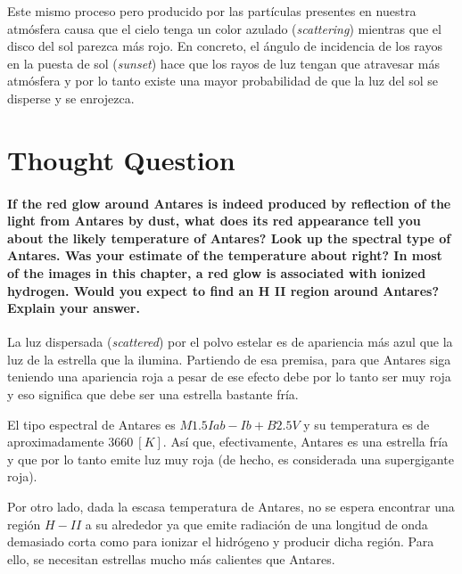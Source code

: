 \documentclass{tufte-handout}
\begin{document}
Este mismo proceso pero producido por las partículas presentes en nuestra atmósfera causa que el cielo tenga un color azulado (\emph{scattering}) mientras que el disco del sol parezca más rojo. En concreto, el ángulo de incidencia de los rayos en la puesta de sol (\emph{sunset}) hace que los rayos de luz tengan que atravesar más atmósfera y por lo tanto existe una mayor probabilidad de que la luz del sol se disperse y se enrojezca.

\section{Thought Question}

\paragraph{\textbf{If the red glow around Antares is indeed produced by reflection of the light from Antares by dust, what does its red appearance tell you about the likely temperature of Antares? Look up the spectral type of Antares. Was your estimate of the temperature about right? In most of the images in this chapter, a red glow is associated with ionized hydrogen. Would you expect to find an H II region around Antares? Explain your answer.}}

La luz dispersada (\emph{scattered}) por el polvo estelar es de apariencia más azul que la luz de la estrella que la ilumina. Partiendo de esa premisa, para que Antares siga teniendo una apariencia roja a pesar de ese efecto debe por lo tanto ser muy roja y eso significa que debe ser una estrella bastante fría.

El tipo espectral de Antares es $M1.5Iab-Ib + B2.5V$ y su temperatura es de aproximadamente $3660~[K]$. Así que, efectivamente, Antares es una estrella fría y que por lo tanto emite luz muy roja (de hecho, es considerada una supergigante roja).

Por otro lado, dada la escasa temperatura de Antares, no se espera encontrar una región $H-II$ a su alrededor ya que emite radiación de una longitud de onda demasiado corta como para ionizar el hidrógeno y producir dicha región. Para ello, se necesitan estrellas mucho más calientes que Antares. 



\end{document}
